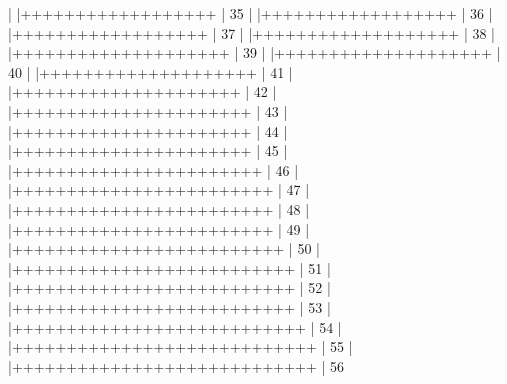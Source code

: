 \documentclass[12pt]{article}
\begin{document}
\begin{Schunk}
\begin{Soutput}
  |                                                        
  |++++++++++++++++++                                |  35%
  |                                                        
  |++++++++++++++++++                                |  36%
  |                                                        
  |++++++++++++++++++                                |  37%
  |                                                        
  |+++++++++++++++++++                               |  38%
  |                                                        
  |++++++++++++++++++++                              |  39%
  |                                                        
  |++++++++++++++++++++                              |  40%
  |                                                        
  |++++++++++++++++++++                              |  41%
  |                                                        
  |+++++++++++++++++++++                             |  42%
  |                                                        
  |++++++++++++++++++++++                            |  43%
  |                                                        
  |++++++++++++++++++++++                            |  44%
  |                                                        
  |++++++++++++++++++++++                            |  45%
  |                                                        
  |+++++++++++++++++++++++                           |  46%
  |                                                        
  |++++++++++++++++++++++++                          |  47%
  |                                                        
  |++++++++++++++++++++++++                          |  48%
  |                                                        
  |++++++++++++++++++++++++                          |  49%
  |                                                        
  |+++++++++++++++++++++++++                         |  50%
  |                                                        
  |++++++++++++++++++++++++++                        |  51%
  |                                                        
  |++++++++++++++++++++++++++                        |  52%
  |                                                        
  |++++++++++++++++++++++++++                        |  53%
  |                                                        
  |+++++++++++++++++++++++++++                       |  54%
  |                                                        
  |++++++++++++++++++++++++++++                      |  55%
  |                                                        
  |++++++++++++++++++++++++++++                      |  56%

\end{Soutput}
\end{Schunk}
\end{document}
